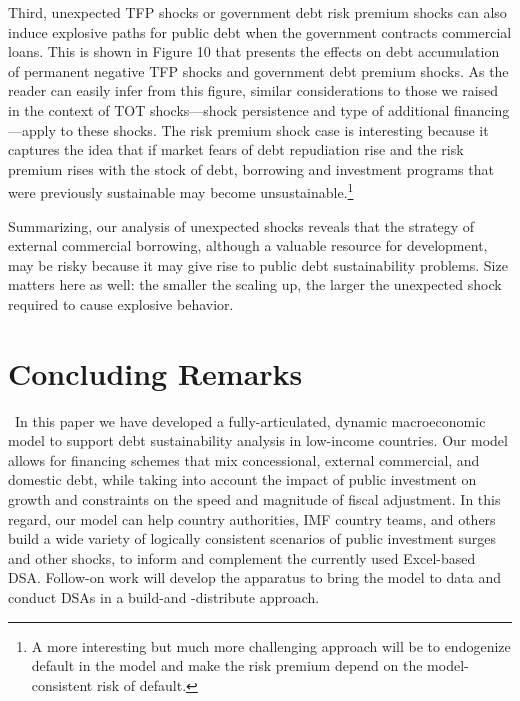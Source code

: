 \documentclass[11pt]{article}
\begin{document}
Third, unexpected TFP shocks or government debt risk premium shocks can also
induce explosive paths for public debt when the government contracts
commercial loans. This is shown in Figure 10 that presents the effects on
debt accumulation of permanent negative TFP shocks and government debt
premium shocks. As the reader can easily infer from this figure, similar
considerations to those we raised in the context of TOT shocks---shock
persistence and type of additional financing---apply to these shocks. The
risk premium shock case is interesting because it captures the idea that if
market fears of debt repudiation rise and the risk premium rises with the
stock of debt, borrowing and investment programs that were previously
sustainable may become unsustainable.\footnote{%
A more interesting but much more challenging approach will be to endogenize
default in the model and make the risk premium depend on the
model-consistent risk of default.}

Summarizing, our analysis of unexpected shocks reveals that the strategy of
external commercial borrowing, although a valuable resource for development,
may be risky because it may give rise to public debt sustainability
problems. Size matters here as well: the smaller the scaling up, the larger
the unexpected shock required to cause explosive behavior.

\section{Concluding Remarks}

\quad\ \thinspace In this paper we have developed a fully-articulated,
dynamic macroeconomic model to support debt sustainability analysis in
low-income countries. Our model allows for financing schemes that mix
concessional, external commercial, and domestic debt, while taking into
account the impact of public investment on growth and constraints on the
speed and magnitude of fiscal adjustment. In this regard, our model can help
country authorities, IMF country teams, and others build a wide variety of
logically consistent scenarios of public investment surges and other shocks,
to inform and complement the currently used Excel-based DSA. Follow-on work
will develop the apparatus to bring the model to data and conduct DSAs in a
build-and -distribute approach.
\end{document}

